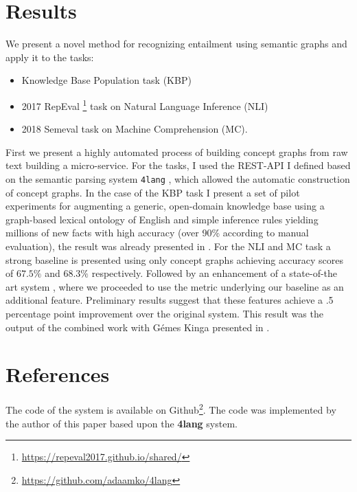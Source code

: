 \section{Results}
We present a novel method for recognizing entailment using semantic
graphs and apply it to the tasks:
\begin{itemize}
    \item Knowledge Base Population task (KBP)
    \item 2017 RepEval \footnote{\url{https://repeval2017.github.io/shared/}} task on Natural Language Inference (NLI)
    \item 2018 Semeval task on Machine
    Comprehension (MC).
\end{itemize}
First we present a highly automated process of building concept graphs from raw text building a micro-service.
For the tasks, I used the REST-API I defined based on the semantic parsing system \texttt{4lang} \cite{Recski:2016d}, which allowed the automatic construction of concept graphs.
In the case of the KBP task I present a set of pilot experiments for augmenting a generic, open-domain 
knowledge base using a graph-based lexical ontology of English and simple
inference rules yielding millions of new facts with high
accuracy (over 90\% according to manual evaluation), the result was already presented in \cite{Kovacs:2018}.
For the NLI and MC task a strong baseline is presented using only concept graphs achieving accuracy scores of $67.5\%$ and $68.3\%$ respectively.
Followed by an enhancement of a state-of-the art system
\cite{Wang:2018}, where we proceeded to use the metric underlying our baseline as an additional feature. Preliminary results suggest that these features achieve a .5 percentage point improvement over the original system. This result was the output of the combined work with G\'emes Kinga presented in \cite{Kovacs:2018b}.

\section{References}
The code of the system is available on Github\footnote{\url{https://github.com/adaamko/4lang}}. The code was implemented by the author of this paper based upon the \textbf{4lang} system.

